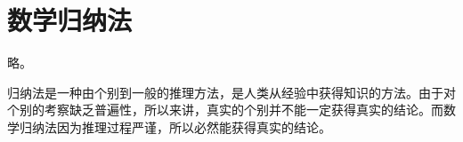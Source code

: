 \section{数学归纳法}

略。

\begin{tcolorbox}
归纳法是一种由个别到一般的推理方法，是人类从经验中获得知识的方法。由于对个别的考察缺乏普遍性，所以来讲，真实的个别并不能一定获得真实的结论。而数学归纳法因为推理过程严谨，所以必然能获得真实的结论。
\end{tcolorbox}




